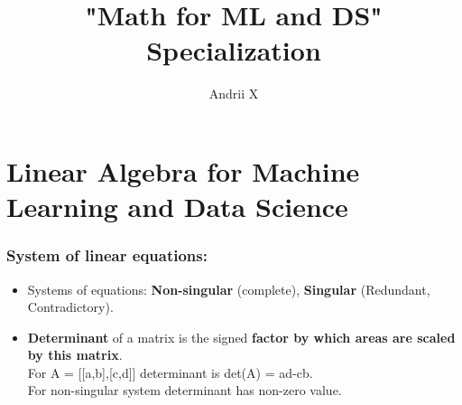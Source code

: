 \documentclass[16pt]{article}
\title{"Math for ML and DS" Specialization }
\author{ Andrii X }
\date{}
\begin{document}
	\maketitle
	
	\section{Linear Algebra for Machine Learning and Data Science}
	\subsubsection{System of linear equations:}
\begin{itemize}
	\item {Systems of equations: \textbf{Non-singular} (complete), \textbf{Singular} (Redundant, Contradictory).}
	\item {\textbf{Determinant} of a matrix is the signed \textbf{factor by which areas are scaled by this matrix}. 
	\\
	For A = [[a,b],[c,d]] determinant is det(A) = ad-cb. 
	\\
	For non-singular system determinant has non-zero value.}
\end{itemize}

 
	
	
\end{document}
